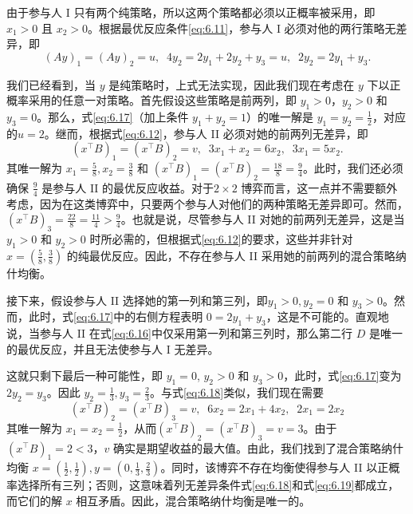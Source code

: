 由于参与人 I 只有两个纯策略，所以这两个策略都必须以正概率被采用，即 \({x}_{1} > 0\) 且 \({x}_{2} > 0\)。根据最优反应条件\eqref{eq:6.11}，参与人 I 必须对他的两行策略无差异，即
\begin{equation}   \label{eq:6.17}
{\left( Ay\right) }_{1} = {\left( Ay\right) }_{2} = u,\;\;4{y}_{2} = 2{y}_{1} + 2{y}_{2} + {y}_{3} = u,\;\;2{y}_{2} = 2{y}_{1} + {y}_{3}.
\end{equation} 

我们已经看到，当 \(y\) 是纯策略时，上式无法实现，因此我们现在考虑在 \(y\) 下以正概率采用的任意一对策略。首先假设这些策略是前两列，即 \({y}_{1} > 0\)，\({y}_{2} > 0\) 和 \({y}_{3} = 0\)。那么，式\eqref{eq:6.17}（加上条件 \({y}_{1} + {y}_{2} = 1\)）的唯一解是 \({y}_{1} = {y}_{2} = \frac{1}{2}\)，对应的\(u = 2\)。继而，根据式\eqref{eq:6.12}，参与人 II 必须对她的前两列无差异，即
\begin{equation}   \label{eq:6.18}
{\left( {x}^{\top }B\right) }_{1} = {\left( {x}^{\top }B\right) }_{2} = v,\;\;3{x}_{1} + {x}_{2} = 6{x}_{2},\;\;3{x}_{1} = 5{x}_{2}.
\end{equation} 
其唯一解为 \({x}_{1} = \frac{5}{8},{x}_{2} = \frac{3}{8}\) 和 \({\left( {x}^{\top }B\right) }_{1} = {\left( {x}^{\top }B\right) }_{2} = \frac{18}{8} = \frac{9}{4}\)。此时，我们还必须确保 \(\frac{9}{4}\) 是参与人 II 的最优反应收益。对于\(2 \times  2\) 博弈而言，这一点并不需要额外考虑，因为在这类博弈中，只要两个参与人对他们的两种策略无差异即可。然而，\({\left( {x}^{\top }B\right) }_{3} = \frac{22}{8} = \frac{11}{4} > \frac{9}{4}\)。也就是说，尽管参与人 II 对她的前两列无差异，这是当 \({y}_{1} > 0\) 和 \({y}_{2} > 0\) 时所必需的，但根据式\eqref{eq:6.12}的要求，这些并非针对 \(x = \left( {\frac{5}{8},\frac{3}{8}}\right)\) 的纯最优反应。因此，不存在参与人 II 采用她的前两列的混合策略纳什均衡。

接下来，假设参与人 II 选择她的第一列和第三列，即\({y}_{1} > 0,{y}_{2} = 0\) 和 \({y}_{3} > 0\)。然而，此时，式\eqref{eq:6.17}中的右侧方程表明 \(0 = 2{y}_{1} + {y}_{3}\)，这是不可能的。直观地说，当参与人 II 在式\eqref{eq:6.16}中仅采用第一列和第三列时，那么第二行 \(D\) 是唯一的最优反应，并且无法使参与人 I 无差异。

这就只剩下最后一种可能性，即 \({y}_{1} = 0\), \({y}_{2} > 0\) 和 \({y}_{3} > 0\)，此时，式\eqref{eq:6.17}变为 \(2{y}_{2} = {y}_{3}\)。因此 \({y}_{2} = \frac{1}{3},{y}_{3} = \frac{2}{3}\)。与式\eqref{eq:6.18}类似，我们现在需要
\begin{equation}   \label{eq:6.19}
{\left( {x}^{\top }B\right) }_{2} = {\left( {x}^{\top }B\right) }_{3} = v,\;\;6{x}_{2} = 2{x}_{1} + 4{x}_{2},\;\;2{x}_{1} = 2{x}_{2}
\end{equation} 
其唯一解为 \({x}_{1} = {x}_{2} = \frac{1}{2}\)，从而\({\left( {x}^{\top }B\right) }_{2} = {\left( {x}^{\top }B\right) }_{3} = v = 3\)。由于 \({\left( {x}^{\top }B\right) }_{1} = 2 < 3\)，\(v\) 确实是期望收益的最大值。由此，我们找到了混合策略纳什均衡 \(x = \left( {\frac{1}{2},\frac{1}{2}}\right), y = \left( {0,\frac{1}{3},\frac{2}{3}}\right)\)。同时，该博弈不存在均衡使得参与人 II 以正概率选择所有三列；否则，这意味着列无差异条件式\eqref{eq:6.18}和式\eqref{eq:6.19}都成立，而它们的解 \(x\) 相互矛盾。因此，混合策略纳什均衡是唯一的。

